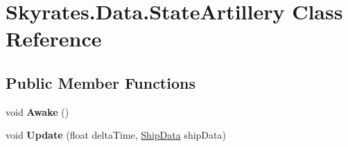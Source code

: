 \hypertarget{class_skyrates_1_1_data_1_1_state_artillery}{\section{Skyrates.\-Data.\-State\-Artillery Class Reference}
\label{class_skyrates_1_1_data_1_1_state_artillery}
}
\subsection*{Public Member Functions}
\begin{DoxyCompactItemize}
\item 
\hypertarget{class_skyrates_1_1_data_1_1_state_artillery_a27b8448bfadba4abee5f0ac618bccad9}{void {\bfseries Awake} ()}\label{class_skyrates_1_1_data_1_1_state_artillery_a27b8448bfadba4abee5f0ac618bccad9}

\item 
\hypertarget{class_skyrates_1_1_data_1_1_state_artillery_a12bdd74137249f669264ebc2a3cdf024}{void {\bfseries Update} (float delta\-Time, \hyperlink{class_skyrates_1_1_ship_1_1_ship_data}{Ship\-Data} ship\-Data)}\label{class_skyrates_1_1_data_1_1_state_artillery_a12bdd74137249f669264ebc2a3cdf024}

\end{DoxyCompactItemize}
